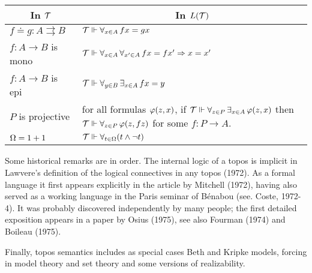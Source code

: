 \begin{center}
\begin{tabular}{ l | l }
\multicolumn{1}{c}{In ${\mathcal T}$} & \multicolumn{1}{c}{In $L({\mathcal T})$} \\
 \hline
 $f \doteq g : A \rightrightarrows B$ & ${\mathcal T} \Vdash \forall_{x\in A}\, fx = gx$ \\
 $f: A \to B$ is mono & ${\mathcal T} \Vdash \forall_{x\in A}\, \forall_{x'\in A}\, fx = fx' \Rightarrow x = x'$\\
 $f: A \to B$ is epi & ${\mathcal T} \Vdash \forall_{y\in B}\, \exists_{x\in A}\, fx = y$\\
 $P$ is projective & \begin{minipage}[t]{50mm}
for all formulas $\varphi(z,x)$, if ${\mathcal T} \Vdash \forall_{z\in P}\,\exists_{x \in A}\, \varphi(z,x)$
then ${\mathcal T} \Vdash \forall_{z\in P}\, \varphi(z,fz)$
for some $f : P \to A$.
\end{minipage}\\[3.5em]
$\Omega = 1 + 1$ & ${\mathcal T} \Vdash \forall_{t\in \Omega} (t \wedge \neg t)$\\
 \hline
\end{tabular}
\end{center}
\medskip
Some historical remarks are in order. The internal logic of a topos is
implicit in Lawvere's definition of the logical connectives in any topos
(1972). As a formal language it first appears explicitly in the article by
Mitchell (1972), having also served as a working language in the Paris seminar
of B\'enabou (see. Coste, 1972-4). It was probably discovered independently by
many people; the first detailed exposition appears in a paper by Osius (1975),
see also Fourman (1974) and Boileau (1975).

Finally, topos semantics includes as special cases Beth and Kripke models,
forcing in model theory and set theory and some versions of realizability.




